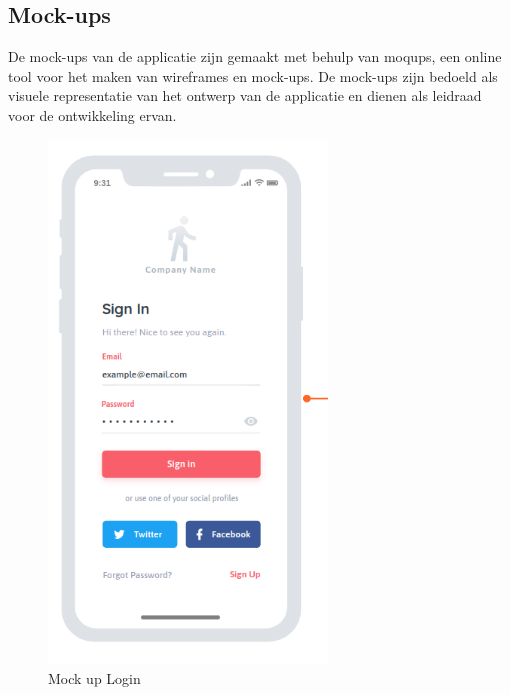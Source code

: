 \subsection{Mock-ups}

De mock-ups van de applicatie zijn gemaakt met behulp van moqups, een online tool voor het maken van wireframes en mock-ups. De mock-ups zijn bedoeld als visuele representatie van het ontwerp van de applicatie en dienen als leidraad voor de ontwikkeling ervan.

    \begin{figure}[H]
        \includegraphics[width=20em]{./graphics/login_Mockup.png}
        \centering
        \caption{Mock up Login}
        \label{fig:loginMockup}
    \end{figure}

